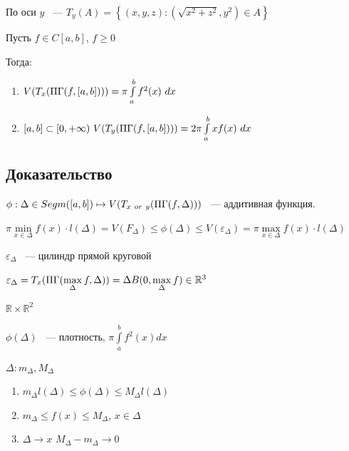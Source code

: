 \documentclass{article}
\begin{document}
            По оси $y$ ~--- $T_y(A) = \left\{ (x, y, z) : (\sqrt{x^2 + z^2}, y^2) \in A \right\}$
        
            Пусть $f \in C[a, b]$, $f \geq 0$
            
            Тогда:
            
            \begin{enumerate}
            
                \item $V(T_x(\Pi\Gamma(f, [a, b]))) = \pi \int\limits^b_a f^2(x) \ dx$
                
                \item $[a, b] \subset [0, +\infty) \ V(T_y(\PG(f, [a, b]))) = 2 \pi \int\limits^b_a x f(x) \ dx$
                
            \end{enumerate}
            
        \subsection{Доказательство}
        
            $\phi: \Delta \in Segm([a, b]) \mapsto V(T_{x \ or \ y} (\Pi\Gamma(f, \Delta)))$ ~--- аддитивная функция.
            
            $\pi \min\limits_{x \in \Delta} f(x) \cdot l(\Delta) = V(F_{\Delta}) \leq \phi(\Delta) \leq V(\varepsilon_{\Delta}) = \pi \max\limits_{x \in \Delta} f(x) \cdot l(\Delta)$
            
            $\varepsilon_{\Delta}$ ~--- цилиндр прямой круговой
            
            $\varepsilon_{\Delta} = T_x(\Pi\Gamma(\max\limits_{\Delta} f, \Delta)) = \Delta B(0, \max\limits_{\Delta} f) \in \mathbb{R}^3$
            
            $\mathbb{R} \times \mathbb{R}^2$
            
            $\phi(\Delta)$ ~--- плотность, $\pi \int\limits^b_a f^2(x) dx$
            
            $\Delta : m_{\Delta}, M_{\Delta}$
            
            \begin{enumerate}
            
                \item $m_{\Delta} l(\Delta) \leq \phi(\Delta) \leq M_{\Delta} l(\Delta)$
                
                \item $m_{\Delta} \leq f(x) \leq M_{\Delta}$, $x \in \Delta$
                
                \item $\Delta \rightarrow x$ $M_{\Delta} - m_{\Delta} \rightarrow 0$
                
            \end{enumerate}
            
\end{document}
